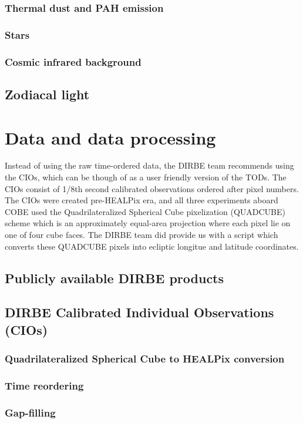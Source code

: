 \documentclass{aa}
\begin{document}
\subsubsection{Thermal dust and PAH emission}
\subsubsection{Stars}
\subsubsection{Cosmic infrared background}
\subsection{Zodiacal light}


\section{Data and data processing}
Instead of using the raw time-ordered data, the DIRBE team recommends using the CIOs, which can be though of as a user friendly version of the TODs. The CIOs consist of 1/8th second calibrated observations ordered after pixel numbers. The CIOs were created pre-HEALPix era, and all three experiments aboard COBE used the Quadrilateralized Spherical Cube pixelization (QUADCUBE) scheme which is an approximately equal-area projection where each pixel lie on one of four cube faces. The DIRBE team did provide us with a script which converts these QUADCUBE pixels into ecliptic longitue and latitude coordinates.
\subsection{Publicly available DIRBE products}
\subsection{DIRBE Calibrated Individual Observations (CIOs)}
\subsubsection{Quadrilateralized Spherical Cube to HEALPix conversion}
\subsubsection{Time reordering}
\subsubsection{Gap-filling}
\end{document}
